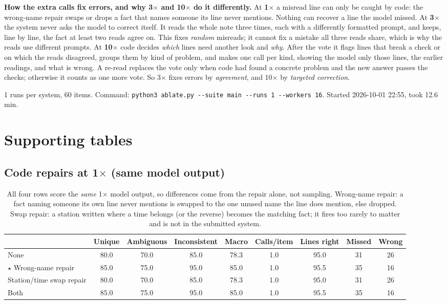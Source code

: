 \documentclass[10pt]{article}
\begin{document}
\textbf{How the extra calls fix errors, and why 3$\times$ and 10$\times$ do it differently.}
At \textbf{1$\times$} a misread line can only be caught by code: the wrong-name repair swaps or drops a fact that names someone its line never mentions. Nothing can recover a line the model missed.
At \textbf{3$\times$} the system never asks the model to correct itself. It reads the whole note three times, each with a differently formatted prompt, and keeps, line by line, the fact at least two reads agree on. This fixes \emph{random} misreads; it cannot fix a mistake all three reads share, which is why the reads use different prompts.
At \textbf{10$\times$} code decides \emph{which} lines need another look and \emph{why}. After the vote it flags lines that break a check or on which the reads disagreed, groups them by kind of problem, and makes one call per kind, showing the model only those lines, the earlier readings, and what is wrong. A re-read replaces the vote only when code had found a concrete problem and the new answer passes the checks; otherwise it counts as one more vote. So 3$\times$ fixes errors by \emph{agreement}, and 10$\times$ by \emph{targeted correction}.

{\footnotesize 1 runs per system, 60 items. Command: \texttt{python3 ablate.py -{}-suite main -{}-runs 1 -{}-workers 16}. Started 2026-10-01 22:55, took 12.6 min.}

\clearpage
\section*{Supporting tables}
\subsection*{Code repairs at 1$\times$ (same model output)}
\begin{table}[H]
\centering\footnotesize\setlength{\tabcolsep}{3.5pt}\renewcommand{\arraystretch}{1.08}
\begin{tabular}{@{}p{5.4cm} ccc c c ccc@{}}
\toprule
 & Unique & Ambiguous & Inconsistent & \textbf{Macro} & Calls/item & Lines right & Missed & Wrong \\
\midrule
None & 80.0 & 70.0 & 85.0 & 78.3 & 1.0 & 95.0 & 31 & 26 \\
$\star$ Wrong-name repair & 85.0 & 75.0 & 95.0 & 85.0 & 1.0 & 95.5 & 35 & 16 \\
Station/time swap repair & 80.0 & 70.0 & 85.0 & 78.3 & 1.0 & 95.0 & 31 & 26 \\
Both & 85.0 & 75.0 & 95.0 & 85.0 & 1.0 & 95.5 & 35 & 16 \\
\bottomrule
\end{tabular}
\caption{All four rows score the \emph{same} 1$\times$ model output, so differences come from the repair alone, not sampling. Wrong-name repair: a fact naming someone its own line never mentions is swapped to the one unused name the line does mention, else dropped. Swap repair: a station written where a time belongs (or the reverse) becomes the matching fact; it fires too rarely to matter and is not in the submitted system.}
\end{table}
\end{document}
